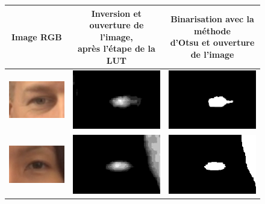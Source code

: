 \begin{figure}[H]
  \centering
  \begin{tabular}{|c|c|c|}
    \hline
     Image RGB & \shortstack{Inversion et ouverture de l'image, \\ après l'étape de la LUT}  & \shortstack{Binarisation avec la méthode \\ d'Otsu et ouverture de l'image} \\
    \hline
    \includegraphics[width=4cm]{image/008/rgb_source.png} & \includegraphics[width=4cm]{image/008/ycbcr_inv_open.png} & \includegraphics[width=4cm]{image/008/ycbcr_bin_open.png} \\
    \hline
    \includegraphics[width=4cm]{image/017/rgb_source.png} & \includegraphics[width=4cm]{image/017/ycbcr_inv_open.png} & \includegraphics[width=4cm]{image/017/ycbcr_bin_open.png} \\

\end{tabular}
\end{figure}
